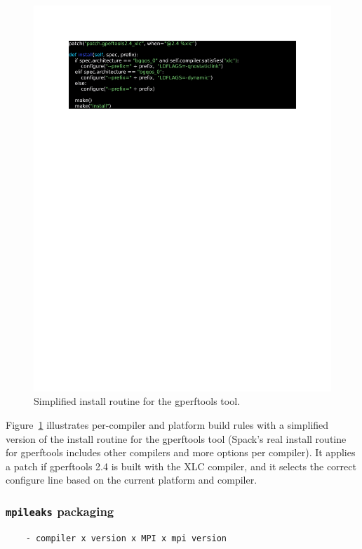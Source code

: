 \begin{figure}
  \includegraphics[width=\columnwidth]{code/gperftools.pdf}
  \caption{
    Simplified install routine for the gperftools tool.
    \label{fig:gperftools}
  }
\end{figure}

Figure~\ref{fig:gperftools} illustrates per-compiler and platform build rules with a simplified version of the install routine for the gperftools tool (Spack's real install routine for gperftools includes other compilers and more options per compiler).  It applies a patch if gperftools 2.4 is built with the XLC compiler, and it selects the correct configure line based on the current platform and compiler.  

\subsubsection{{\tt mpileaks} packaging}
\begin{verbatim}
	- compiler x version x MPI x mpi version
\end{verbatim}

